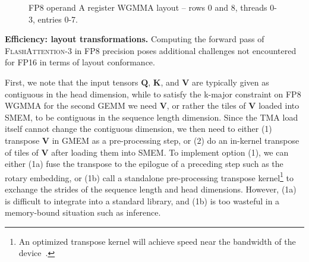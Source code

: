 \documentclass{article}
\newcommand{\vQ}{\mathbf{Q}}
\newcommand{\vK}{\mathbf{K}}
\newcommand{\vV}{\mathbf{V}}
\newcommand{\fat}{\textsc{FlashAttention-3}\xspace}  %
\begin{document}
\begin{figure}
\centering
{}
\caption{FP8 operand A register WGMMA layout -- rows 0 and 8, threads 0-3, entries 0-7.}
\label{fig:rmem_operand}
\end{figure}

\textbf{Efficiency: layout transformations.}
Computing the forward pass of \fat in FP8 precision poses additional challenges not encountered for FP16 in terms of layout conformance.

First, we note that the input tensors $\vQ$, $\vK$, and $\vV$
are typically given as contiguous in the head dimension,
while to satisfy the k-major constraint on FP8 WGMMA for the second GEMM we need $\vV$,
or rather the tiles of $\vV$ loaded into SMEM, to be contiguous in the sequence length dimension.
Since the TMA load itself cannot change the contiguous dimension, we then need to either
(1) transpose $\vV$ in GMEM as a pre-processing step, or
(2) do an in-kernel transpose of tiles of $\vV$ after loading them into SMEM.
To implement option (1), we can either
(1a) fuse the transpose to the epilogue of a preceding step such as the rotary embedding, or
(1b) call a standalone pre-processing transpose
kernel\footnote{An optimized transpose kernel will achieve speed near the bandwidth of the device~\citep{colfax_cutlass_transpose_2024}.}
to exchange the strides of the sequence length and head dimensions.
However, (1a) is difficult to integrate into a standard library,
and (1b) is too wasteful in a memory-bound situation such as inference.
\end{document}
